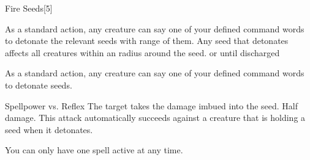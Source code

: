 \begin{spellfooter}
\begin{spellsection}{Fire Seeds}[5]
\begin{spellcontent}
\begin{spelleffects}
            As a standard action, any creature can say one of your defined command words to detonate the relevant seeds with \rngmed range of them. Any seed that detonates affects all creatures within an \areasmall radius around the seed.
            \spelldur \durext or until discharged
        \end{spelleffects}
    \end{spellcontent}
    \begin{spellsubcontent}
        \begin{spelltargetinginfo}
            \spellspecial As a standard action, any creature can say one of your defined command words to detonate seeds.
            \spellrng{\rngmed}
        \end{spelltargetinginfo}
        \begin{spelleffects}
            \begin{spellattack}{Spellpower vs. Reflex}
                \spellsuccess The target takes the damage imbued into the seed.
                \spellfailure Half damage.
                \spellspecial This attack automatically succeeds against a creature that is holding a seed when it detonates.
            \end{spellattack}
        \end{spelleffects}
    \end{spellsubcontent}
    \begin{spellfooter}
        \spellnotes You can only have one  spell active at any time.
        \miscastexplode
    \end{spellfooter}
\end{spellsection}


\end{spellfooter}
